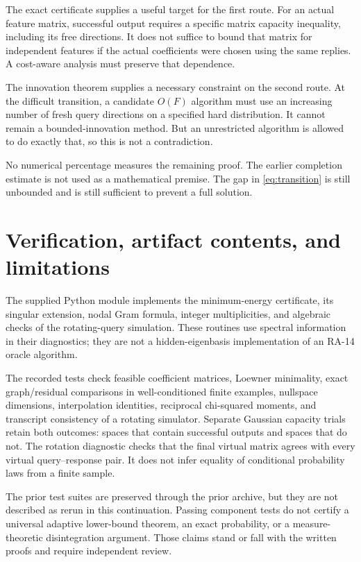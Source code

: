 \documentclass[11pt]{article}
\theoremstyle{definition}
\begin{document}
The exact certificate supplies a useful target for the first route. For an actual feature matrix, successful output requires a specific matrix capacity inequality, including its free directions. It does not suffice to bound that matrix for independent features if the actual coefficients were chosen using the same replies. A cost-aware analysis must preserve that dependence.

The innovation theorem supplies a necessary constraint on the second route. At the difficult transition, a candidate $O(F)$ algorithm must use an increasing number of fresh query directions on a specified hard distribution. It cannot remain a bounded-innovation method. But an unrestricted algorithm is allowed to do exactly that, so this is not a contradiction.

No numerical percentage measures the remaining proof. The earlier completion estimate is not used as a mathematical premise. The gap in \eqref{eq:transition} is still unbounded and is still sufficient to prevent a full solution.

\section{Verification, artifact contents, and limitations}
The supplied Python module implements the minimum-energy certificate, its singular extension, nodal Gram formula, integer multiplicities, and algebraic checks of the rotating-query simulation. These routines use spectral information in their diagnostics; they are not a hidden-eigenbasis implementation of an RA-14 oracle algorithm.

The recorded tests check feasible coefficient matrices, Loewner minimality, exact graph/residual comparisons in well-conditioned finite examples, nullspace dimensions, interpolation identities, reciprocal chi-squared moments, and transcript consistency of a rotating simulator. Separate Gaussian capacity trials retain both outcomes: spaces that contain successful outputs and spaces that do not. The rotation diagnostic checks that the final virtual matrix agrees with every virtual query--response pair. It does not infer equality of conditional probability laws from a finite sample.



The prior test suites are preserved through the prior archive, but they are not described as rerun in this continuation. Passing component tests do not certify a universal adaptive lower-bound theorem, an exact probability, or a measure-theoretic disintegration argument. Those claims stand or fall with the written proofs and require independent review.
\end{document}
